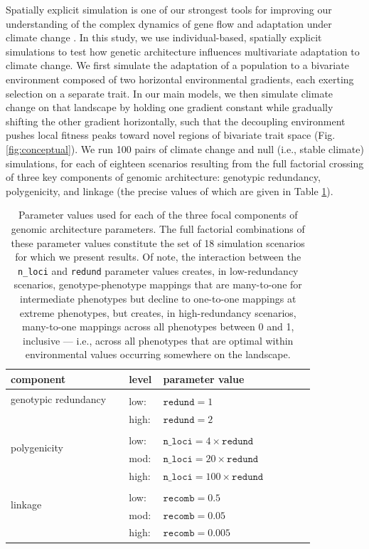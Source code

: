\documentclass[9pt,twocolumn,twoside,lineno]{pnas-new}
\begin{document}
Spatially explicit simulation is one of our strongest tools
for improving our understanding of the complex dynamics of gene flow and adaptation
under climate change \cite{capblancq_review}.
In this study, we use individual-based, spatially explicit simulations
to test how genetic architecture influences multivariate adaptation to climate change.
We first simulate 
the adaptation of a population to a bivariate environment composed of two horizontal 
environmental gradients, each exerting selection on a separate trait.
In our main models, we then simulate climate change on that landscape by holding one gradient 
constant while gradually shifting the other gradient horizontally, such that
the decoupling environment pushes local fitness peaks toward novel regions 
of bivariate trait space (Fig. \ref{fig:conceptual}).
We run 100 pairs of climate change
and null (i.e., stable climate) simulations, for each of eighteen scenarios
resulting from the full factorial crossing of three key components
of genomic architecture: genotypic redundancy, polygenicity, and linkage
(the precise values of which are given in Table \ref{tab:tab_1}).

\begin{table}
\begin{tabular}{b{0.35\linewidth}b{0.05\linewidth}b{0.45\linewidth}}
\hline
\textbf{component} & \textbf{level} & \textbf{parameter value} \\
\hline
\multirow{2}{10em}{genotypic redundancy} \\
& low: & $\texttt{redund}=1$ \\
& high: & $\texttt{redund}=2$ \\
\hline
\multirow{3}{10em}{polygenicity} \\
& low: & $\texttt{n\_loci}=4\times \texttt{redund}$ \\ 
& mod: & $\texttt{n\_loci}=20\times \texttt{redund}$ \\
& high: & $\texttt{n\_loci}=100\times \texttt{redund}$ \\
\hline
\multirow{3}{10em}{linkage} \\
& low: & $\texttt{recomb}=0.5$ \\
& mod: & $\texttt{recomb}=0.05$ \\
& high: & $\texttt{recomb}=0.005$ \\
\hline
\end{tabular}
\medskip
\caption{\label{tab:tab_1}Parameter values used for each of the three focal components of genomic architecture parameters. The full factorial combinations of these parameter values constitute the set of 18 simulation scenarios for which we present results. Of note, the interaction between the \texttt{n\_loci} and \texttt{redund} parameter values creates, in low-redundancy scenarios, genotype-phenotype mappings that are many-to-one for intermediate phenotypes but decline to one-to-one mappings at extreme phenotypes, but creates, in high-redundancy scenarios, many-to-one mappings across all phenotypes between 0 and 1, inclusive --- i.e., across all phenotypes that are optimal within environmental values occurring somewhere on the landscape.}
\end{table}
\end{document}
